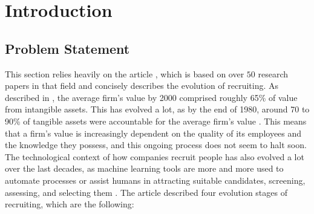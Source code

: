 \documentclass[draft,final]{thesisclass} %
\begin{document}
\begin{abstract}
\lipsum[1]
\end{abstract}

\mainmatter

\chapter{Introduction} \label{introduction}

\section{Problem Statement} \label{problem_statement}
This section relies heavily on the article \textcite{ai_recruiting}, which is based on over $50$ research papers in that field and concisely describes the evolution of recruiting.
As described in \textcite[1]{ai_recruiting}, the average firm's value by 2000 comprised roughly 65\% of value from intangible assets.
This has evolved a lot, as by the end of 1980, around 70 to 90\% of tangible assets were accountable for the average firm's value \parencite[1]{ai_recruiting}.
This means that a firm's value is increasingly dependent on the quality of its employees and the knowledge they possess, and this ongoing process does not seem to halt soon.
The technological context of how companies recruit people has also evolved a lot over the last decades, as machine learning tools are more and more used to automate processes or assist humans in attracting suitable candidates, screening, assessing, and selecting them \parencite[2]{ai_recruiting}.
The article \textcite[2-4]{ai_recruiting} described four evolution stages of recruiting, which are the following:
\end{document}

